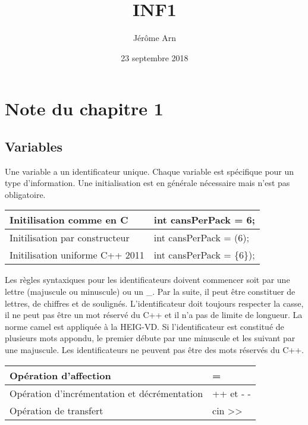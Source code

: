 \documentclass{article}
\title{INF1}
\author{Jérôme Arn}
\date{23 septembre 2018}
\begin{document}
\maketitle
\newpage

\tableofcontents
\newpage

\section{Note du chapitre 1}
\subsection{Variables}
Une variable a un identificateur unique. Chaque variable est spécifique pour un type d'information. Une initialisation est en générale nécessaire mais n'est pas obligatoire.

\bigskip %
\begin{tabular}{|l|l|}  

\hline %
Initilisation comme en C & int cansPerPack = 6; \\
\hline %
Initilisation par constructeur & int cansPerPack = (6); \\ 
\hline %
Initilisation uniforme C++ 2011 & int cansPerPack = \{6\}); \\ 
\hline %

\end{tabular} 
\bigskip %

Les règles syntaxiques pour les identificateurs doivent commencer soit par une lettre (majuscule ou minuscule) ou un \_. Par la suite, il peut être constituer de lettres, de chiffres et de soulignés. L’identificateur doit toujours respecter la casse, il ne peut pas être un mot réservé du C++ et il n'a pas de limite de longueur. La norme camel est appliquée à la HEIG-VD. Si l'identificateur est constitué de plusieurs mots appondu, le premier débute par une minuscule et les suivant par une majuscule. Les identificateurs ne peuvent pas être des mots réservés du C++.\\

\bigskip %
\begin{tabular}{|l|l|}  

\hline %
Opération d'affection & =  \\
\hline %
Opération d'incrémentation et décrémentation & ++ et - -  \\ 
\hline %
Opération de transfert & cin >> \\ 
\hline %

\end{tabular} 
\bigskip %
\end{document}
